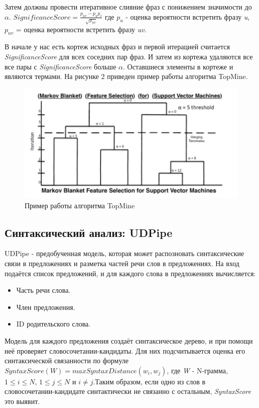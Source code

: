 Затем должны провести итеративное слияние фраз с понижением значимости до $\alpha$.
$SignificanceScore = \frac{p_{uv}-p_{u}p_{v}}{\sqrt{p_{uv}}}$
где $p_{u}$ - оценка вероятности встретить фразу \textit{u}, $p_{uv}$ = оценка вероятности встретить фразу \textit{uv}.

В начале у нас есть кортеж исходных фраз и первой итерацией считается \textit{SignificanceScore} для всех соседних пар фраз. И затем из кортежа удаляются все все пары с \textit{SignificanceScore} больше $\alpha$. Оставшиеся элементы в кортеже и являются термами. На рисунке 2 приведен пример работы алгоритма TopMine.
\begin{figure}
    \includegraphics[scale = 0.5]{chapters/rules/images/ml2.png}
    \caption{Пример работы алгоритма TopMine}
\end{figure}
\subsection*{Синтаксический анализ: UDPipe}

UDPipe - предобученная модель, которая может распозновать синтаксические связи в предложениях и разметка частей речи слов в предложениях. На вход подаётся список предложений, и для каждого слова в предложениях вычисляется:

\begin{itemize}
	\item Часть речи слова.
	\item Член предложения.
	\item ID родительского слова.
\end{itemize}

Модель для каждого предложения создаёт синтаксическое дерево, и при помощи неё проверяет словосочетании-кандидаты. Для них подсчитывается оценка его синтаксической связанности по формуле $SyntaxScore(W) = max SyntaxDistance(w_{i}, w_{j})$, где \textit{W} - N-грамма, $1 \leq i \leq N$, $1 \leq j \leq N$ и $i \neq j$.Таким образом, если одно из слов в словосочетании-кандидате синтактически не связанно с остальным, \textit{SyntaxScore} это выявит.

